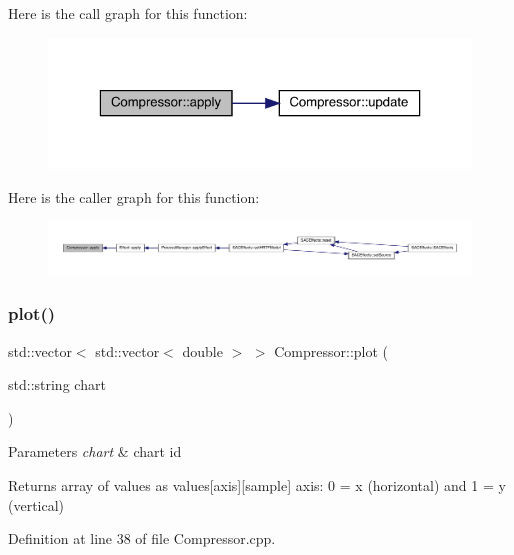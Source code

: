 Here is the call graph for this function\+:
\nopagebreak
\begin{figure}[H]
\begin{center}
\leavevmode
\includegraphics[width=323pt]{class_compressor_a2937588c4c8ff8cb3781444663f392e9_cgraph}
\end{center}
\end{figure}
Here is the caller graph for this function\+:
\nopagebreak
\begin{figure}[H]
\begin{center}
\leavevmode
\includegraphics[width=350pt]{class_compressor_a2937588c4c8ff8cb3781444663f392e9_icgraph}
\end{center}
\end{figure}
\mbox{\label{class_compressor_a57e231b206c612382a6cf4c348868838}} 
\subsubsection{\texorpdfstring{plot()}{plot()}}
{\footnotesize\ttfamily std\+::vector$<$ std\+::vector$<$ double $>$ $>$ Compressor\+::plot (\begin{DoxyParamCaption}\item[{std\+::string}]{chart }\end{DoxyParamCaption})}


\begin{DoxyParams}{Parameters}
{\em chart} & chart id \\
\hline
\end{DoxyParams}
\begin{DoxyReturn}{Returns}
array of values as values\mbox{[}axis\mbox{]}\mbox{[}sample\mbox{]} axis\+: 0 = x (horizontal) and 1 = y (vertical) 
\end{DoxyReturn}


Definition at line 38 of file Compressor.\+cpp.

